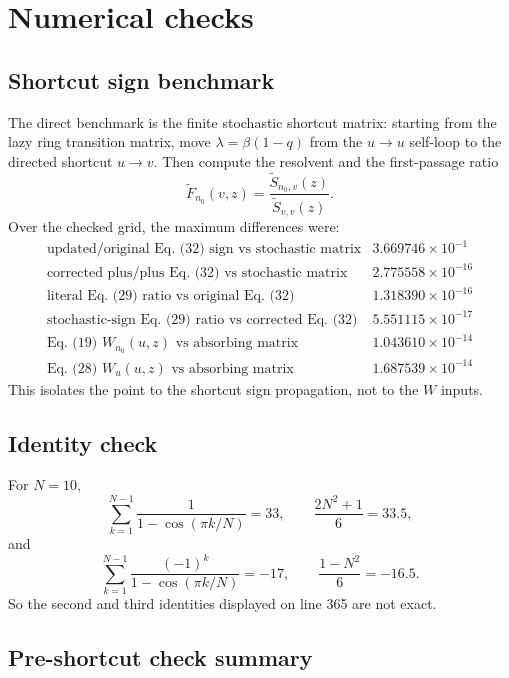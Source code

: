 \documentclass[11pt]{article}
\newcommand{\wt}{\widetilde}
\begin{document}
\section*{Numerical checks}

\subsection*{Shortcut sign benchmark}

The direct benchmark is the finite stochastic shortcut matrix: starting from
the lazy ring transition matrix, move
\(\lambda=\beta(1-q)\) from the \(u\to u\) self-loop to the directed shortcut
\(u\to v\).  Then compute the resolvent and the first-passage ratio
\[
  \wt F_{n_0}(v,z)=\frac{\wt S_{n_0,v}(z)}{\wt S_{v,v}(z)}.
\]
Over the checked grid, the maximum differences were:
\[
\begin{array}{ll}
\text{updated/original Eq. (32) sign vs stochastic matrix} & 3.669746\times10^{-1}\\
\text{corrected plus/plus Eq. (32) vs stochastic matrix} & 2.775558\times10^{-16}\\
\text{literal Eq. (29) ratio vs original Eq. (32)} & 1.318390\times10^{-16}\\
\text{stochastic-sign Eq. (29) ratio vs corrected Eq. (32)} & 5.551115\times10^{-17}\\
\text{Eq. (19) } W_{n_0}(u,z)\text{ vs absorbing matrix} & 1.043610\times10^{-14}\\
\text{Eq. (28) } W_u(u,z)\text{ vs absorbing matrix} & 1.687539\times10^{-14}
\end{array}
\]
This isolates the point to the shortcut sign propagation, not to the \(W\)
inputs.

\subsection*{Identity check}

For \(N=10\),
\[
  \sum_{k=1}^{N-1}\frac{1}{1-\cos(\pi k/N)}=33,
  \qquad
  \frac{2N^2+1}{6}=33.5,
\]
and
\[
  \sum_{k=1}^{N-1}\frac{(-1)^k}{1-\cos(\pi k/N)}=-17,
  \qquad
  \frac{1-N^2}{6}=-16.5.
\]
So the second and third identities displayed on line 365 are not exact.

\subsection*{Pre-shortcut check summary}
\end{document}
